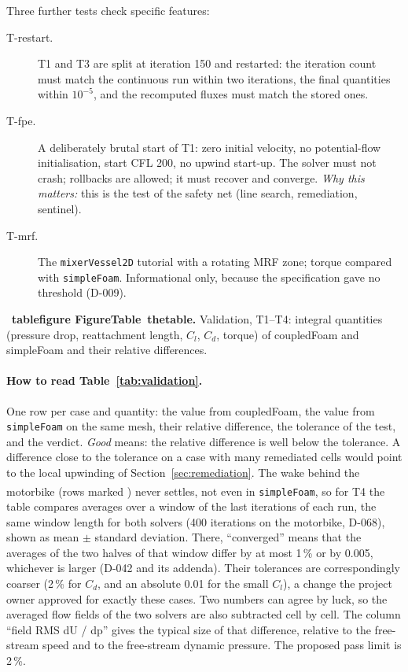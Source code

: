 \documentclass[11pt,a4paper]{article}
\makeatletter
\def\cf@figname{figure}
\newcommand{\cfpendingitem}[3]{%
  \par\smallskip\noindent\refstepcounter{#1}\label{#3}%
  \def\cf@kind{#1}%
  {\footnotesize\fbox{\scriptsize pending}~\textbf{\ifx\cf@kind\cf@figname
    Figure\else Table\fi~\csname the#1\endcsname.} #2\par}\smallskip}
\newcommand{\cftable}[3]{%
  \IfFileExists{tables/#1.tex}%
    {}%
    {\cfpendingitem{table}{#2}{#3}}}
\newcommand{\code}[1]{\texttt{#1}}
\makeatother
\begin{document}
Three further tests check specific features:
\begin{description}
\item[T-restart.] T1 and T3 are split at iteration 150 and restarted: the
  iteration count must match the continuous run within two iterations, the
  final quantities within $10^{-5}$, and the recomputed fluxes must match
  the stored ones.
\item[T-fpe.] A deliberately brutal start of T1: zero initial velocity, no
  potential-flow initialisation, start CFL 200, no upwind start-up. The
  solver must not crash; rollbacks are allowed; it must recover and
  converge. \emph{Why this matters:} this is the test of the safety net
  (line search, remediation, sentinel).
\item[T-mrf.] The \code{mixerVessel2D} tutorial with a rotating MRF zone;
  torque compared with \code{simpleFoam}. Informational only, because the
  specification gave no threshold (D-009).
\end{description}

\cftable{validation}{Validation, T1--T4: integral quantities (pressure drop,
reattachment length, $C_l$, $C_d$, torque) of coupledFoam and simpleFoam and
their relative differences.}{tab:validation}

\paragraph{How to read Table~\ref{tab:validation}.} One row per case and
quantity: the value from coupledFoam, the value from \code{simpleFoam} on the
same mesh, their relative difference, the tolerance of the test, and the
verdict. \emph{Good} means: the relative difference is well below the
tolerance. A difference close to the tolerance on a case with many
remediated cells would point to the local upwinding of
Section~\ref{sec:remediation}. The wake behind the motorbike (rows marked
\textsuperscript{\dag}) never settles, not even in
\code{simpleFoam}, so for T4 the table compares averages over a window of
the last iterations of each run, the same window length for both solvers
(400 iterations on the motorbike, D-068), shown as mean $\pm$ standard
deviation. There, ``converged'' means that the averages of the two halves
of that window differ by at most 1\,\% or by 0.005, whichever is larger
(D-042 and its addenda). Their tolerances are
correspondingly coarser (2\,\% for $C_d$, and an absolute 0.01 for the small
$C_l$), a change the project owner approved for exactly these cases.
Two numbers can agree by luck, so the averaged flow fields of the two
solvers are also subtracted cell by cell. The column ``field RMS dU / dp''
gives the typical size of that difference, relative to the free-stream
speed and to the free-stream dynamic pressure. The proposed pass limit is
2\,\%.
\end{document}
